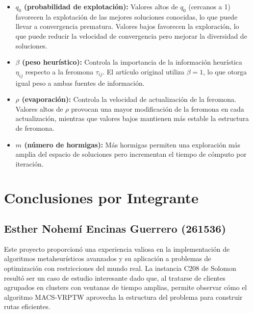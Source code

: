 \documentclass[12pt, letterpaper]{article}
\begin{document}
\begin{itemize}[leftmargin=2cm]
  \item \textbf{$q_0$ (probabilidad de explotación):} Valores altos de $q_0$ (cercanos a 1) favorecen la explotación de las mejores soluciones conocidas, lo que puede llevar a convergencia prematura. Valores bajos favorecen la exploración, lo que puede reducir la velocidad de convergencia pero mejorar la diversidad de soluciones.
  \item \textbf{$\beta$ (peso heurístico):} Controla la importancia de la información heurística $\eta_{ij}$ respecto a la feromona $\tau_{ij}$. El artículo original utiliza $\beta = 1$, lo que otorga igual peso a ambas fuentes de información.
  \item \textbf{$\rho$ (evaporación):} Controla la velocidad de actualización de la feromona. Valores altos de $\rho$ provocan una mayor modificación de la feromona en cada actualización, mientras que valores bajos mantienen más estable la estructura de feromona.
  \item \textbf{$m$ (número de hormigas):} Más hormigas permiten una exploración más amplia del espacio de soluciones pero incrementan el tiempo de cómputo por iteración.
\end{itemize}

\newpage
\section{Conclusiones por Integrante}
\label{sec:conclusiones}

\subsection{Esther Nohemí Encinas Guerrero (261536)}
\label{subsec:conclusion_esther}


Este proyecto proporcionó una experiencia valiosa en la implementación de algoritmos metaheurísticos avanzados y su aplicación a problemas de optimización con restricciones del mundo real. La instancia C208 de Solomon resultó ser un caso de estudio interesante dado que, al tratarse de clientes agrupados en clusters con ventanas de tiempo amplias, permite observar cómo el algoritmo MACS-VRPTW aprovecha la estructura del problema para construir rutas eficientes.
\end{document}
